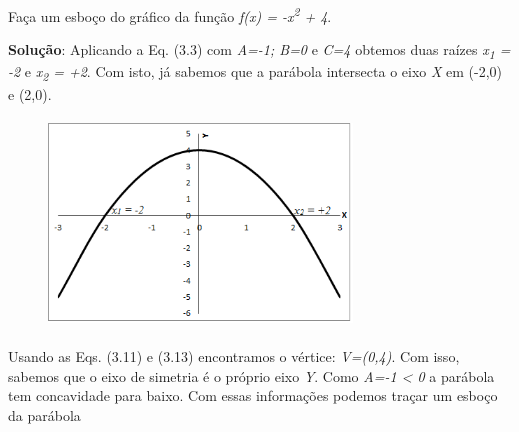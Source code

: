 \begin{texemplo}
Faça um esboço do gráfico da função \textit{f(x) = -x\textsuperscript{2} + 4}. 

\textbf{Solução}: Aplicando a Eq. (3.3) com \textit{A=-1; B=0 }e\textit{ C=4 } obtemos duas raízes   \textit{x\textsubscript{1} = -2} e  \textit{x\textsubscript{2} = +2}. Com isto, já sabemos que a parábola intersecta o eixo \textit{X} em (-2,0) e (2,0).

\begin{figure}[H]
	\begin{Center}
		\includegraphics[width=3.18in,height=2.19in]{capitulos/funcao_do_segundo_grau/media/image8.png}
	\end{Center}
\end{figure}

Usando as Eqs. (3.11) e (3.13) encontramos o vértice: \textit{V=(0,4)}. Com isso, sabemos que o eixo de simetria é o próprio eixo \textit{Y}. Como \textit{A=-1 < 0} a parábola tem concavidade para baixo. Com essas informações podemos traçar um esboço da parábola \qedsymbol{}
\end{texemplo}

